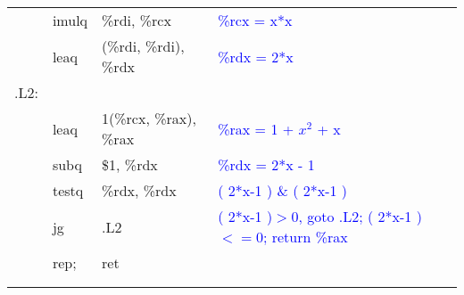 \documentclass{article}
\newcommand{\blue}[1]{\textcolor{blue}{#1}}
\begin{document}
\begin{CJK}{UTF8}{gbsn}
\begin{table}[ht]
\begin{tabular}{m{1em}m{3em}m{12em}l}
	&	imulq	&	\%rdi, \%rcx	&	\blue{\%rcx = x*x}	\\
	&	leaq	&	(\%rdi, \%rdi), \%rdx	&	\blue{\%rdx = 2*x}	\\
	.L2:	\\
	&	leaq	&	1(\%rcx, \%rax), \%rax	&	\blue{\%rax = 1 + $x^2$ + x}	\\
	&	subq	&	\$1, \%rdx		&	\blue{\%rdx = 2*x - 1}	\\
	&	testq	&	\%rdx, \%rdx		&	\blue{( 2*x-1 ) \& ( 2*x-1 )}	\\
	&	jg	&	.L2			&	\blue{( 2*x-1 )$>$0, goto .L2; ( 2*x-1 )$<=0$; return \%rax }	\\
	&	rep;	&	ret			&	\blue{}	\\
	&	&						&	\blue{}	\\
	&	&					&	\blue{}	\\
\end{tabular}
\end{table}	\\



\end{CJK}
\end{document}
